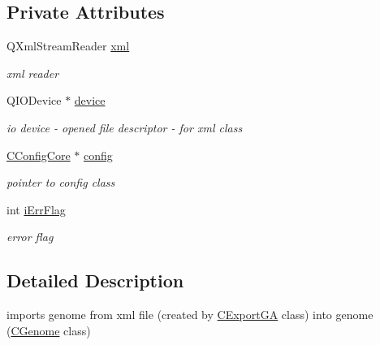 \subsection*{Private Attributes}
\begin{DoxyCompactItemize}
\item 
\hypertarget{classCImportGA_a3e86a20acfc8c396e41dc2a37b9f6e55}{
QXmlStreamReader \hyperlink{classCImportGA_a3e86a20acfc8c396e41dc2a37b9f6e55}{xml}}
\label{classCImportGA_a3e86a20acfc8c396e41dc2a37b9f6e55}

\begin{DoxyCompactList}\small\item\em xml reader \item\end{DoxyCompactList}\item 
\hypertarget{classCImportGA_a8b3d05f98d84a34529eaa25423606e3c}{
QIODevice $\ast$ \hyperlink{classCImportGA_a8b3d05f98d84a34529eaa25423606e3c}{device}}
\label{classCImportGA_a8b3d05f98d84a34529eaa25423606e3c}

\begin{DoxyCompactList}\small\item\em io device -\/ opened file descriptor -\/ for xml class \item\end{DoxyCompactList}\item 
\hypertarget{classCImportGA_afa911e390870cfdaf6abf8351db3a95e}{
\hyperlink{classCConfigCore}{CConfigCore} $\ast$ \hyperlink{classCImportGA_afa911e390870cfdaf6abf8351db3a95e}{config}}
\label{classCImportGA_afa911e390870cfdaf6abf8351db3a95e}

\begin{DoxyCompactList}\small\item\em pointer to config class \item\end{DoxyCompactList}\item 
\hypertarget{classCImportGA_ad1893025f830c3b30ddfd1808fa21606}{
int \hyperlink{classCImportGA_ad1893025f830c3b30ddfd1808fa21606}{iErrFlag}}
\label{classCImportGA_ad1893025f830c3b30ddfd1808fa21606}

\begin{DoxyCompactList}\small\item\em error flag \item\end{DoxyCompactList}\end{DoxyCompactItemize}


\subsection{Detailed Description}
imports genome from xml file (created by \hyperlink{classCExportGA}{CExportGA} class) into genome (\hyperlink{classCGenome}{CGenome} class) 

